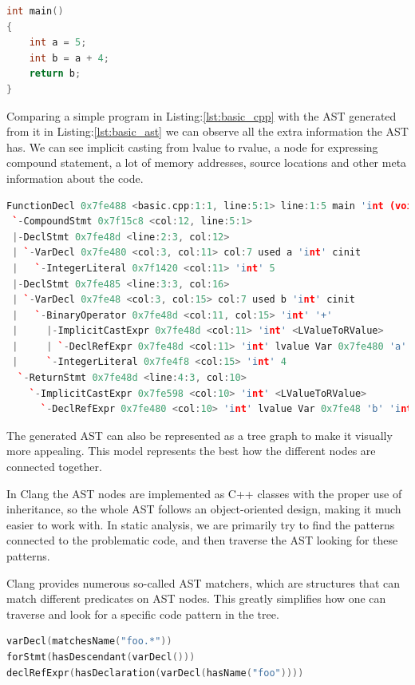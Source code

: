 \begin{lstlisting}[language=c++,frame=single, caption={A simple C++ program}, label={lst:basic_cpp}]
int main() 
{
	int a = 5;
	int b = a + 4;
	return b;
}
\end{lstlisting}
\par Comparing a simple program in Listing:\ref{lst:basic_cpp} with the AST generated from it in Listing:\ref{lst:basic_ast} we can observe all the extra information the AST has. We can see implicit casting from lvalue to rvalue, a node for expressing compound statement, a lot of memory addresses, source locations and other meta information about the code.
\begin{lstlisting}[basicstyle=\scriptsize, language=c++,frame=single, caption={AST generated}, style=ast, label={lst:basic_ast}]
FunctionDecl 0x7fe488 <basic.cpp:1:1, line:5:1> line:1:5 main 'int (void)'
 `-CompoundStmt 0x7f15c8 <col:12, line:5:1>
 |-DeclStmt 0x7fe48d <line:2:3, col:12>
 | `-VarDecl 0x7fe480 <col:3, col:11> col:7 used a 'int' cinit
 |   `-IntegerLiteral 0x7f1420 <col:11> 'int' 5
 |-DeclStmt 0x7fe485 <line:3:3, col:16>
 | `-VarDecl 0x7fe48 <col:3, col:15> col:7 used b 'int' cinit
 |   `-BinaryOperator 0x7fe48d <col:11, col:15> 'int' '+'
 |     |-ImplicitCastExpr 0x7fe48d <col:11> 'int' <LValueToRValue>
 |     | `-DeclRefExpr 0x7fe48d <col:11> 'int' lvalue Var 0x7fe480 'a' 'int'
 |     `-IntegerLiteral 0x7fe4f8 <col:15> 'int' 4
  `-ReturnStmt 0x7fe48d <line:4:3, col:10>
    `-ImplicitCastExpr 0x7fe598 <col:10> 'int' <LValueToRValue>
      `-DeclRefExpr 0x7fe480 <col:10> 'int' lvalue Var 0x7fe48 'b' 'int'
\end{lstlisting}
\par The generated AST can also be represented as a tree graph to make it visually more appealing. This model represents the best how the different nodes are connected together. \medskip
\par In Clang the AST nodes are implemented as C++ classes with the proper use of inheritance, so the whole AST follows an object-oriented design, making it much easier to work with. In static analysis, we are primarily try to find the patterns connected to the problematic code, and then traverse the AST looking for these patterns. \medskip
\par Clang provides numerous so-called AST matchers\cite{ast_reference}, which are structures that can match different predicates on AST nodes. This greatly simplifies how one can traverse and look for a specific code pattern in the tree. 
\begin{lstlisting}[language=c++,frame=single, caption={Basic AST matchers}, style=ast, label={lst:basic_match}]
varDecl(matchesName("foo.*"))
forStmt(hasDescendant(varDecl()))
declRefExpr(hasDeclaration(varDecl(hasName("foo"))))
\end{lstlisting}
